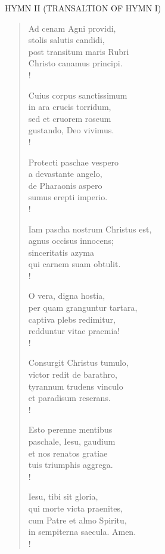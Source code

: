\noindent\small{\uppercase{Hymn II (transaltion of hymn I)}}\normalsize
\begin{verse}
Ad cenam Agni providi,\\
stolis salutis candidi,\\
post transitum maris Rubri\\
Christo canamus principi.\\!

Cuius corpus sanctissimum\\
in ara crucis torridum,\\
sed et cruorem roseum\\
gustando, Deo vivimus.\\!

Protecti paschae vespero\\
a devastante angelo,\\
de Pharaonis aspero\\
sumus erepti imperio.\\!

Iam pascha nostrum Christus est,\\
agnus occisus innocens;\\
sinceritatis azyma\\
qui carnem suam obtulit.\\!

O vera, digna hostia,\\
per quam granguntur tartara,\\
captiva plebs redimitur,\\
redduntur vitae praemia!\\!

Consurgit Christus tumulo,\\
victor redit de barathro,\\
tyrannum trudens vinculo\\
et paradisum reserans.\\!

Esto perenne mentibus\\
paschale, Iesu, gaudium\\
et nos renatos gratiae\\
tuis triumphis aggrega.\\!

Iesu, tibi sit gloria,\\
qui morte victa praenites,\\
cum Patre et almo Spiritu,\\
in sempiterna saecula. Amen.\\!
\end{verse}

